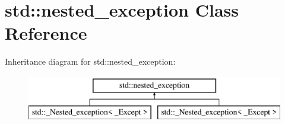 \hypertarget{classstd_1_1nested__exception}{\section{std\+:\+:nested\+\_\+exception Class Reference}
\label{classstd_1_1nested__exception}
}
Inheritance diagram for std\+:\+:nested\+\_\+exception\+:\begin{figure}[H]
\begin{center}
\leavevmode
\includegraphics[height=2.000000cm]{classstd_1_1nested__exception}
\end{center}
\end{figure}
